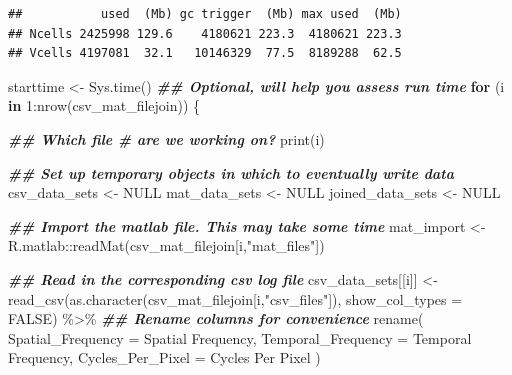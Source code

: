 \documentclass[
]{book}
\newenvironment{Shaded}{\begin{snugshade}}{\end{snugshade}}
\newcommand{\AttributeTok}[1]{\textcolor[rgb]{0.77,0.63,0.00}{#1}}
\newcommand{\ConstantTok}[1]{\textcolor[rgb]{0.00,0.00,0.00}{#1}}
\newcommand{\ControlFlowTok}[1]{\textcolor[rgb]{0.13,0.29,0.53}{\textbf{#1}}}
\newcommand{\DecValTok}[1]{\textcolor[rgb]{0.00,0.00,0.81}{#1}}
\newcommand{\DocumentationTok}[1]{\textcolor[rgb]{0.56,0.35,0.01}{\textbf{\textit{#1}}}}
\newcommand{\FunctionTok}[1]{\textcolor[rgb]{0.00,0.00,0.00}{#1}}
\newcommand{\NormalTok}[1]{#1}
\newcommand{\OtherTok}[1]{\textcolor[rgb]{0.56,0.35,0.01}{#1}}
\newcommand{\SpecialCharTok}[1]{\textcolor[rgb]{0.00,0.00,0.00}{#1}}
\newcommand{\StringTok}[1]{\textcolor[rgb]{0.31,0.60,0.02}{#1}}
\begin{document}
\begin{verbatim}
##           used  (Mb) gc trigger  (Mb) max used  (Mb)
## Ncells 2425998 129.6    4180621 223.3  4180621 223.3
## Vcells 4197081  32.1   10146329  77.5  8189288  62.5
\end{verbatim}

\begin{Shaded}
\begin{Highlighting}[]
\NormalTok{starttime }\OtherTok{\textless{}{-}} \FunctionTok{Sys.time}\NormalTok{() }\DocumentationTok{\#\# Optional, will help you assess run time}
\ControlFlowTok{for}\NormalTok{ (i }\ControlFlowTok{in} \DecValTok{1}\SpecialCharTok{:}\FunctionTok{nrow}\NormalTok{(csv\_mat\_filejoin)) \{}

  \DocumentationTok{\#\# Which file \# are we working on?}
  \FunctionTok{print}\NormalTok{(i)}

  \DocumentationTok{\#\# Set up temporary objects in which to eventually write data}
\NormalTok{  csv\_data\_sets }\OtherTok{\textless{}{-}} \ConstantTok{NULL}
\NormalTok{  mat\_data\_sets }\OtherTok{\textless{}{-}} \ConstantTok{NULL}
\NormalTok{  joined\_data\_sets }\OtherTok{\textless{}{-}} \ConstantTok{NULL}

  \DocumentationTok{\#\# Import the matlab file. This may take some time}
\NormalTok{  mat\_import }\OtherTok{\textless{}{-}}
\NormalTok{    R.matlab}\SpecialCharTok{::}\FunctionTok{readMat}\NormalTok{(csv\_mat\_filejoin[i,}\StringTok{"mat\_files"}\NormalTok{])}

  \DocumentationTok{\#\# Read in the corresponding csv log file}
\NormalTok{  csv\_data\_sets[[i]] }\OtherTok{\textless{}{-}}
    \FunctionTok{read\_csv}\NormalTok{(}\FunctionTok{as.character}\NormalTok{(csv\_mat\_filejoin[i,}\StringTok{"csv\_files"}\NormalTok{]),}
             \AttributeTok{show\_col\_types =} \ConstantTok{FALSE}\NormalTok{) }\SpecialCharTok{\%\textgreater{}\%}
    \DocumentationTok{\#\# Rename columns for convenience}
    \FunctionTok{rename}\NormalTok{(}
      \AttributeTok{Spatial\_Frequency =} \StringTok{\textasciigrave{}}\AttributeTok{Spatial Frequency}\StringTok{\textasciigrave{}}\NormalTok{,}
      \AttributeTok{Temporal\_Frequency =} \StringTok{\textasciigrave{}}\AttributeTok{Temporal Frequency}\StringTok{\textasciigrave{}}\NormalTok{,}
      \AttributeTok{Cycles\_Per\_Pixel =} \StringTok{\textasciigrave{}}\AttributeTok{Cycles Per Pixel}\StringTok{\textasciigrave{}}
\NormalTok{    )}


\end{Highlighting}
\end{Shaded}
\end{document}
